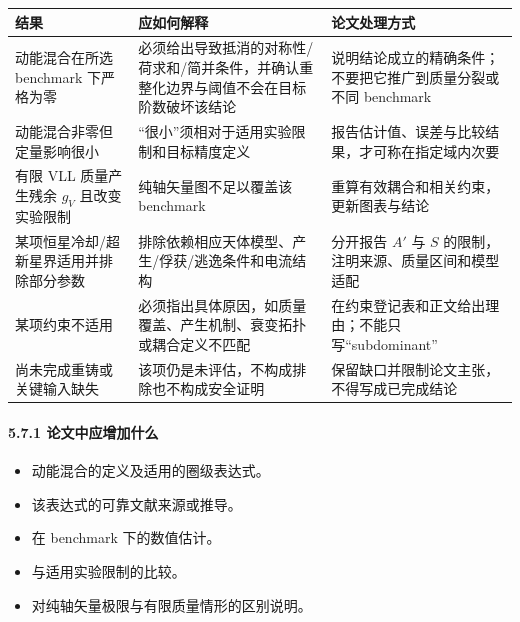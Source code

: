 \documentclass[
  chinese,
  UTF8]{ctexart}
\newcounter{none} %
\providecommand{\tightlist}{%
  \setlength{\itemsep}{0pt}\setlength{\parskip}{0pt}}
\begin{document}
{\def\LTcaptype{none} %
\begin{longtable}[]{@{}
  >{\raggedright\arraybackslash}p{}
  >{\raggedright\arraybackslash}p{}
  >{\raggedright\arraybackslash}p{}@{}}
\toprule\noalign{}
\begin{minipage}[b]{\linewidth}\raggedright
结果
\end{minipage} & \begin{minipage}[b]{\linewidth}\raggedright
应如何解释
\end{minipage} & \begin{minipage}[b]{\linewidth}\raggedright
论文处理方式
\end{minipage} \\
\midrule\noalign{}
\endhead
\bottomrule\noalign{}
\endlastfoot
动能混合在所选 benchmark 下严格为零 &
必须给出导致抵消的对称性/荷求和/简并条件，并确认重整化边界与阈值不会在目标阶数破坏该结论
& 说明结论成立的精确条件；不要把它推广到质量分裂或不同 benchmark \\
动能混合非零但定量影响很小 & ``很小''须相对于适用实验限制和目标精度定义
& 报告估计值、误差与比较结果，才可称在指定域内次要 \\
有限 VLL 质量产生残余 \(g_V\) 且改变实验限制 & 纯轴矢量图不足以覆盖该
benchmark & 重算有效耦合和相关约束，更新图表与结论 \\
某项恒星冷却/超新星界适用并排除部分参数 &
排除依赖相应天体模型、产生/俘获/逃逸条件和电流结构 & 分开报告 \(A'\) 与
\(S\) 的限制，注明来源、质量区间和模型适配 \\
某项约束不适用 &
必须指出具体原因，如质量覆盖、产生机制、衰变拓扑或耦合定义不匹配 &
在约束登记表和正文给出理由；不能只写``subdominant'' \\
尚未完成重铸或关键输入缺失 & 该项仍是未评估，不构成排除也不构成安全证明
& 保留缺口并限制论文主张，不得写成已完成结论 \\
\end{longtable}
}

\paragraph{5.7.1
论文中应增加什么}\label{ux8bbaux6587ux4e2dux5e94ux589eux52a0ux4ec0ux4e48-1}

\begin{itemize}
\tightlist
\item
  动能混合的定义及适用的圈级表达式。
\item
  该表达式的可靠文献来源或推导。
\item
  在 benchmark 下的数值估计。
\item
  与适用实验限制的比较。
\item
  对纯轴矢量极限与有限质量情形的区别说明。
\end{itemize}
\end{document}
